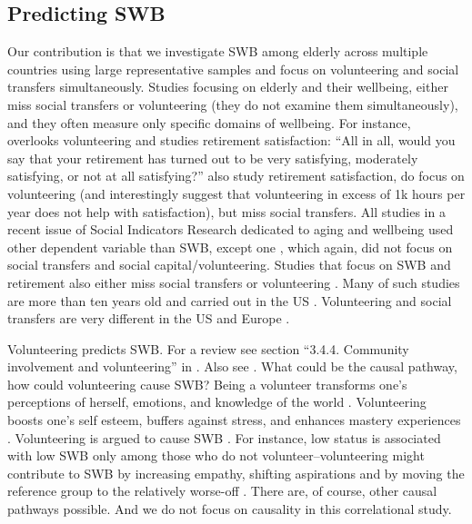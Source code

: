 \documentclass[10pt, letterpaper]{article}
\begin{document}
\begin{spacing}{1.4}
\section*{Predicting SWB}

Our contribution is that we  investigate SWB among elderly
across multiple countries using large representative samples and focus on volunteering and social transfers simultaneously.  
%
Studies focusing on elderly and their wellbeing, either miss social
transfers or volunteering (they do not examine them simultaneously), and they
often measure only specific domains of wellbeing. For instance,
\citet{bender12} overlooks volunteering and studies retirement satisfaction: ``All in all,
would you say that your retirement has turned out to be very satisfying,
moderately satisfying, or not at all satisfying?''
\citet{butrica2005satisfaction} also study retirement satisfaction, do focus on
volunteering (and interestingly suggest that volunteering in excess of 1k hours
per year does not help with satisfaction), but miss social transfers. All studies in a recent issue of Social Indicators Research \citep{jurges12} dedicated to aging and
wellbeing used other dependent variable than SWB, except one
\citep{angelini2012age}, which again, did not focus on social transfers and social capital/volunteering.
Studies that focus on SWB and retirement also either miss social
transfers or volunteering
\citep{dingemans2014involuntary,dingemans2015retirement,nikolova2014employment,angelini2012age}.
 Many of such studies are more than ten years old and carried out in the US
\citep{wheeler98,ferring10}. %
  Volunteering and social transfers are very different in
 the US and  Europe \citep{tocqueville03,fischer10, alesina05al,alesina01,lipset00}.

%
 Volunteering predicts SWB. For a review see section 
 ``3.4.4. Community involvement and volunteering'' in \citet{dolan08al}. Also
 see  \citet{jenkinson2013volunteering}.
%
What could be the causal pathway, how could volunteering cause SWB? Being a
volunteer transforms one's perceptions of herself, emotions, and knowledge of
the world \citep{wilson12B}. %
Volunteering boosts one's self esteem,  buffers against stress, and
 enhances mastery experiences
\citep{wilson12B}. %
%
  Volunteering is argued to cause
 SWB \citep{meier2008volunteering,borgonovi2008doing}. For instance, low status is associated
with low SWB only among those who do not volunteer--volunteering
might contribute to SWB by increasing empathy, shifting aspirations and by
moving the reference group to the relatively worse-off
\citep{borgonovi2008doing}. There are, of course, other causal pathways
possible. And we do not focus on causality in this correlational study.


\end{spacing}
\end{document}
